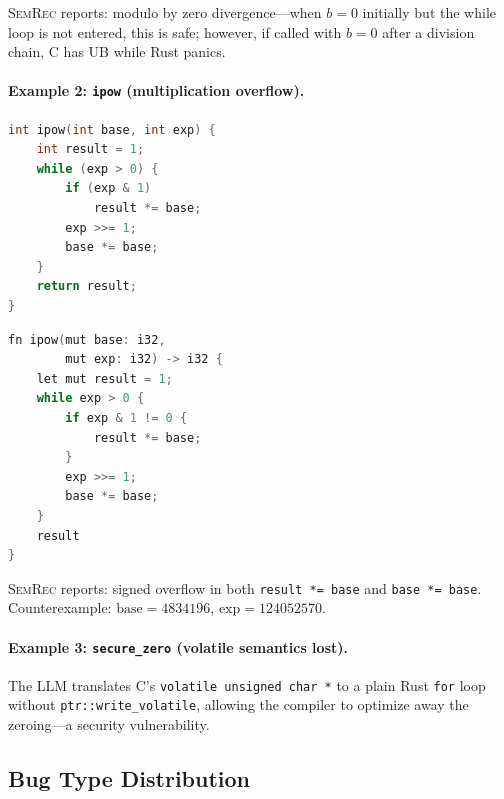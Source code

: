 \documentclass[11pt,a4paper]{article}
\begin{document}
\begin{appendices}
\textsc{SemRec} reports: modulo by zero divergence---when $b = 0$ initially
but the while loop is not entered, this is safe; however, if called with
$b = 0$ after a division chain, C has UB while Rust panics.

\paragraph{Example 2: \texttt{ipow} (multiplication overflow).}
\begin{minipage}[t]{0.48\textwidth}
\begin{lstlisting}[language=C,title=C source]
int ipow(int base, int exp) {
    int result = 1;
    while (exp > 0) {
        if (exp & 1)
            result *= base;
        exp >>= 1;
        base *= base;
    }
    return result;
}
\end{lstlisting}
\end{minipage}
\hfill
\begin{minipage}[t]{0.48\textwidth}
\begin{lstlisting}[language=C,title=LLM Rust translation]
fn ipow(mut base: i32,
        mut exp: i32) -> i32 {
    let mut result = 1;
    while exp > 0 {
        if exp & 1 != 0 {
            result *= base;
        }
        exp >>= 1;
        base *= base;
    }
    result
}
\end{lstlisting}
\end{minipage}

\textsc{SemRec} reports: signed overflow in both \texttt{result *= base}
and \texttt{base *= base}.  Counterexample: $\text{base}=4834196$,
$\text{exp}=124052570$.

\paragraph{Example 3: \texttt{secure\_zero} (volatile semantics lost).}
The LLM translates C's \texttt{volatile unsigned char *} to a plain
Rust \texttt{for} loop without \texttt{ptr::write\_volatile}, allowing
the compiler to optimize away the zeroing---a security vulnerability.

\subsection{Bug Type Distribution}


\end{appendices}
\end{document}

